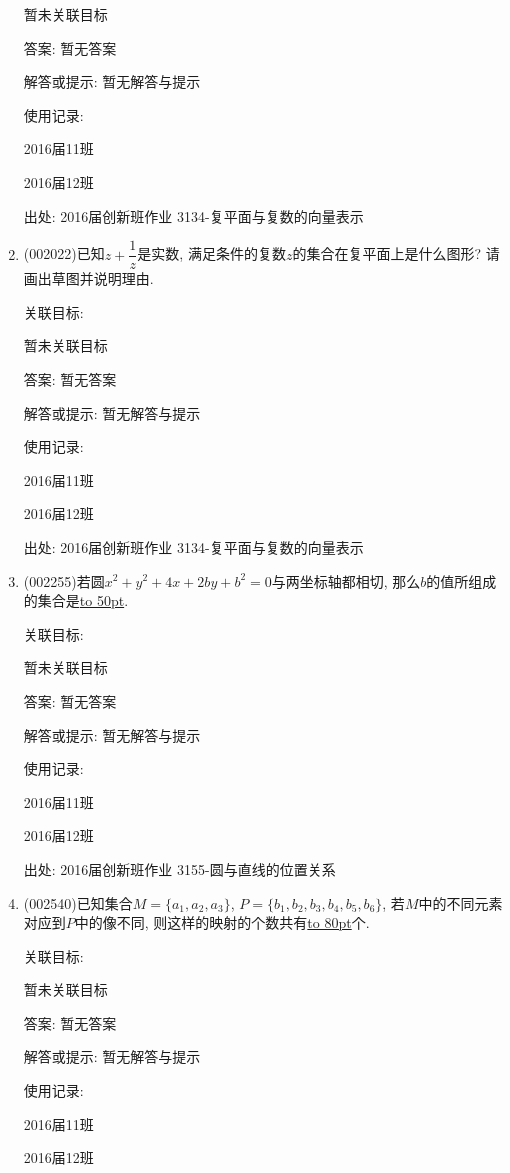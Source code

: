 \documentclass[10pt,a4paper]{article}
\newcommand{\blank}[1]{\underline{\hbox to #1pt{}}}
\begin{document}
\begin{enumerate}[1.]
暂未关联目标

答案: 暂无答案

解答或提示: 暂无解答与提示

使用记录:

2016届11班	

2016届12班	


出处: 2016届创新班作业	3134-复平面与复数的向量表示
\item { (002022)}已知$z+\dfrac{1}{z}$是实数, 满足条件的复数$z$的集合在复平面上是什么图形? 请画出草图并说明理由.


关联目标:

暂未关联目标

答案: 暂无答案

解答或提示: 暂无解答与提示

使用记录:

2016届11班	

2016届12班	


出处: 2016届创新班作业	3134-复平面与复数的向量表示
\item { (002255)}若圆$x^2+y^2+4x+2by+b^2=0$与两坐标轴都相切, 那么$b$的值所组成的集合是\blank{50}.


关联目标:

暂未关联目标

答案: 暂无答案

解答或提示: 暂无解答与提示

使用记录:

2016届11班	

2016届12班	


出处: 2016届创新班作业	3155-圆与直线的位置关系
\item { (002540)}已知集合$M=\{a_1,a_2,a_3\}$, $P=\{b_1,b_2,b_3,b_4,b_5,b_6\}$, 若$M$中的不同元素对应到$P$中的像不同, 则这样的映射的个数共有\blank{80}个.


关联目标:

暂未关联目标

答案: 暂无答案

解答或提示: 暂无解答与提示

使用记录:

2016届11班	

2016届12班	



\end{enumerate}
\end{document}
